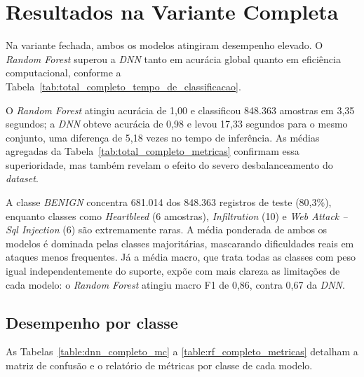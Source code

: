 \section{Resultados na Variante Completa}

Na variante fechada, ambos os modelos atingiram desempenho elevado. O \textit{Random Forest} superou a \textit{DNN} tanto em acurácia global quanto em eficiência computacional, conforme a Tabela~\ref{tab:total_completo_tempo_de_classificacao}.



O \textit{Random Forest} atingiu acurácia de 1,00 e classificou 848.363 amostras em 3,35 segundos; a \textit{DNN} obteve acurácia de 0,98 e levou 17,33 segundos para o mesmo conjunto, uma diferença de 5,18 vezes no tempo de inferência. As médias agregadas da Tabela~\ref{tab:total_completo_metricas} confirmam essa superioridade, mas também revelam o efeito do severo desbalanceamento do \textit{dataset}.



A classe \textit{BENIGN} concentra 681.014 dos 848.363 registros de teste (80,3\%), enquanto classes como \textit{Heartbleed} (6 amostras), \textit{Infiltration} (10) e \textit{Web Attack -- Sql Injection} (6) são extremamente raras. A média ponderada de ambos os modelos é dominada pelas classes majoritárias, mascarando dificuldades reais em ataques menos frequentes. Já a média macro, que trata todas as classes com peso igual independentemente do suporte, expõe com mais clareza as limitações de cada modelo: o \textit{Random Forest} atingiu macro F1 de 0,86, contra 0,67 da \textit{DNN}.

\subsection{Desempenho por classe}

As Tabelas~\ref{table:dnn_completo_mc} a \ref{table:rf_completo_metricas} detalham a matriz de confusão e o relatório de métricas por classe de cada modelo.







